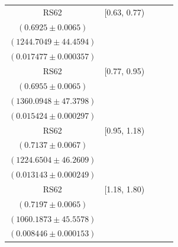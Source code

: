 {\begin{longtable}{|c|c|c|c|c|}
RS62 & [0.63, 0.77) & \begin{tabular}{@{}c@{}}$0.7171 \pm 0.0059$ \\ $(0.6925 \pm 0.0065)$\end{tabular} & \begin{tabular}{@{}c@{}}$1202.1053 \pm 42.9378$ \\ $(1244.7049 \pm 44.4594)$\end{tabular} & \begin{tabular}{@{}c@{}}$0.015013 \pm 0.000442$ \\ $(0.017477 \pm 0.000357)$\end{tabular} \\ \hline
RS62 & [0.77, 0.95) & \begin{tabular}{@{}c@{}}$0.7085 \pm 0.0059$ \\ $(0.6955 \pm 0.0065)$\end{tabular} & \begin{tabular}{@{}c@{}}$1335.2327 \pm 46.5137$ \\ $(1360.0948 \pm 47.3798)$\end{tabular} & \begin{tabular}{@{}c@{}}$0.015065 \pm 0.000388$ \\ $(0.015424 \pm 0.000297)$\end{tabular} \\ \hline
RS62 & [0.95, 1.18) & \begin{tabular}{@{}c@{}}$0.7061 \pm 0.0062$ \\ $(0.7137 \pm 0.0067)$\end{tabular} & \begin{tabular}{@{}c@{}}$1240.6728 \pm 46.7162$ \\ $(1224.6504 \pm 46.2609)$\end{tabular} & \begin{tabular}{@{}c@{}}$0.012283 \pm 0.000324$ \\ $(0.013143 \pm 0.000249)$\end{tabular} \\ \hline
RS62 & [1.18, 1.80) & \begin{tabular}{@{}c@{}}$0.6814 \pm 0.0069$ \\ $(0.7197 \pm 0.0065)$\end{tabular} & \begin{tabular}{@{}c@{}}$1119.8134 \pm 48.1200$ \\ $(1060.1873 \pm 45.5578)$\end{tabular} & \begin{tabular}{@{}c@{}}$0.008446 \pm 0.000202$ \\ $(0.008446 \pm 0.000153)$\end{tabular} \\ \hline
\end{longtable}
}
